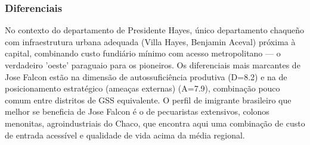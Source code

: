 \subsubsection*{Diferenciais}\label{dif-jose-falcon-1506}
No contexto do departamento de Presidente Hayes, único departamento chaqueño com infraestrutura urbana adequada (Villa Hayes, Benjamin Aceval) próxima à capital, combinando custo fundiário mínimo com acesso metropolitano — o verdadeiro 'oeste' paraguaio para os pioneiros. Os diferenciais mais marcantes de Jose Falcon estão na dimensão de autossuficiência produtiva (D=8.2) e na de posicionamento estratégico (ameaças externas) (A=7.9), combinação pouco comum entre distritos de GSS equivalente. O perfil de imigrante brasileiro que melhor se beneficia de Jose Falcon é o de pecuaristas extensivos, colonos menonitas, agroindustriais do Chaco, que encontra aqui uma combinação de custo de entrada acessível e qualidade de vida acima da média regional.
